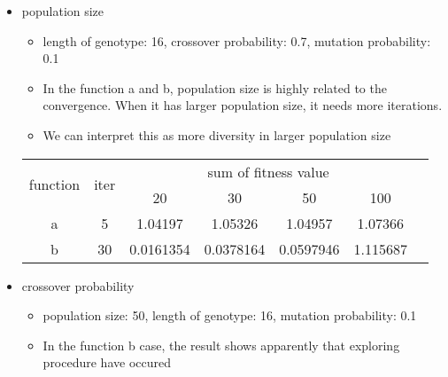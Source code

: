\documentclass{standalone}
\begin{document}
\begin{enumerate}
\begin{itemize}
\begin{table}[!h]
\begin{center}
\begin{tabular}{| c | c | c | c  | c | c | c }
     \end{tabular}
    \end{center}
    \label{table:table1}
    \end{table}
    \item population size
    \begin{itemize}
      \item length of genotype: 16, crossover probability: 0.7, mutation probability: 0.1
      \item In the function a and b, population size is highly related to the convergence. When it has larger population size, it needs more iterations.
      \item We can interpret this as more diversity in larger population size
    \end{itemize}
    \begin{table}[!h]
    \begin{center}
      \begin{tabular}{| c | c | c | c  | c | c | c } \hline
      \multirow{2}{*}{function} & \multirow{2}{*}{iter} & \multicolumn{4}{c|}{sum of fitness value} \\ \cline{3-6}
                                &                       & 20        & 30        & 50        & 100 \\ \hline
               a                &  5                    & 1.04197   & 1.05326   & 1.04957   & 1.07366  \\ \hline
               b                &  30                   & 0.0161354 & 0.0378164 & 0.0597946 & 1.115687  \\ \hline
     \end{tabular}
    \end{center}
    \end{table}
    \item crossover probability
    \begin{itemize}
      \item population size: 50, length of genotype: 16, mutation probability: 0.1
      \item In the function b case, the result shows apparently that exploring procedure have occured
    \end{itemize}
    \begin{table}[!h]
    \begin{center}

\end{center}
\end{table}
\end{itemize}
\end{enumerate}
\end{document}
